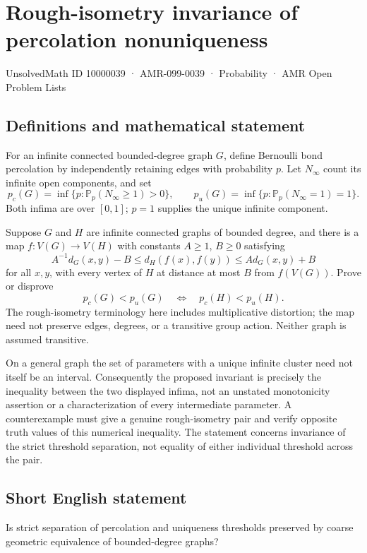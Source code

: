 \documentclass[11pt,a4paper]{article}
\begin{document}
\section*{Rough-isometry invariance of percolation nonuniqueness}\label{10000039}
{\small UnsolvedMath ID 10000039 · AMR-099-0039 · Probability · AMR Open Problem Lists}
\subsection{Definitions and mathematical statement}
For an infinite connected bounded-degree graph $G$, define Bernoulli bond percolation by independently retaining edges with probability $p$. Let $N_\infty$ count its infinite open components, and set
\[
p_c(G)=\inf\{p:\mathbb P_p(N_\infty\ge1)>0\},\qquad
p_u(G)=\inf\{p:\mathbb P_p(N_\infty=1)=1\}.
\]
Both infima are over $[0,1]$; $p=1$ supplies the unique infinite component.

Suppose $G$ and $H$ are infinite connected graphs of bounded degree, and there is a map $f:V(G)\to V(H)$ with constants $A\ge1$, $B\ge0$ satisfying
\[
A^{-1}d_G(x,y)-B\le d_H(f(x),f(y))\le A d_G(x,y)+B
\]
for all $x,y$, with every vertex of $H$ at distance at most $B$ from $f(V(G))$. Prove or disprove
\[
p_c(G)<p_u(G)\quad\Longleftrightarrow\quad p_c(H)<p_u(H).
\]
The rough-isometry terminology here includes multiplicative distortion; the map need not preserve edges, degrees, or a transitive group action. Neither graph is assumed transitive.

On a general graph the set of parameters with a unique infinite cluster need not itself be an interval. Consequently the proposed invariant is precisely the inequality between the two displayed infima, not an unstated monotonicity assertion or a characterization of every intermediate parameter. A counterexample must give a genuine rough-isometry pair and verify opposite truth values of this numerical inequality. The statement concerns invariance of the strict threshold separation, not equality of either individual threshold across the pair.
\subsection{Short English statement}
Is strict separation of percolation and uniqueness thresholds preserved by coarse geometric equivalence of bounded-degree graphs?
\end{document}
